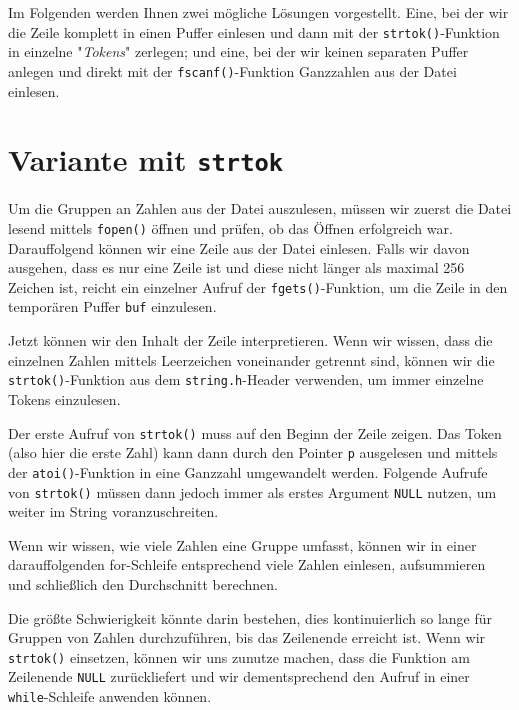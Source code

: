 Im Folgenden werden Ihnen zwei mögliche Lösungen vorgestellt. Eine, bei der wir
die Zeile komplett in einen Puffer einlesen und dann mit der
\texttt{strtok()}-Funktion in einzelne "\textit{Tokens}" zerlegen; und
eine, bei der wir keinen separaten Puffer anlegen und direkt mit der
\texttt{fscanf()}-Funktion Ganzzahlen aus der Datei einlesen.

\section*{Variante mit \texttt{strtok}}

Um die Gruppen an Zahlen aus der Datei auszulesen, müssen wir zuerst die Datei
lesend mittels \texttt{fopen()} öffnen und prüfen, ob das Öffnen
erfolgreich war. Darauffolgend können wir eine Zeile aus der Datei einlesen.
Falls wir davon ausgehen, dass es nur eine Zeile ist und diese nicht länger als
maximal 256 Zeichen ist, reicht ein einzelner Aufruf der
\texttt{fgets()}-Funktion, um die Zeile in den temporären Puffer
\texttt{buf} einzulesen.

Jetzt können wir den Inhalt der Zeile interpretieren. Wenn wir wissen, dass die
einzelnen Zahlen mittels Leerzeichen voneinander getrennt sind, können wir die
\texttt{strtok()}-Funktion aus dem \texttt{string.h}-Header
verwenden, um immer einzelne Tokens einzulesen.

Der erste Aufruf von \texttt{strtok()} muss auf den Beginn der Zeile
zeigen. Das Token (also hier die erste Zahl) kann dann durch den Pointer
\texttt{p} ausgelesen und mittels der \texttt{atoi()}-Funktion in
eine Ganzzahl umgewandelt werden. Folgende Aufrufe von \texttt{strtok()}
müssen dann jedoch immer als erstes Argument \texttt{NULL} nutzen, um
weiter im String voranzuschreiten.

Wenn wir wissen, wie viele Zahlen eine Gruppe umfasst, können wir in einer
darauffolgenden for-Schleife entsprechend viele Zahlen einlesen, aufsummieren
und schließlich den Durchschnitt berechnen.

Die größte Schwierigkeit könnte darin bestehen, dies kontinuierlich so lange für
Gruppen von Zahlen durchzuführen, bis das Zeilenende erreicht ist. Wenn wir
\texttt{strtok()} einsetzen, können wir uns zunutze machen, dass die
Funktion am Zeilenende \texttt{NULL} zurückliefert und wir
dementsprechend den Aufruf in einer \texttt{while}-Schleife anwenden
können.

